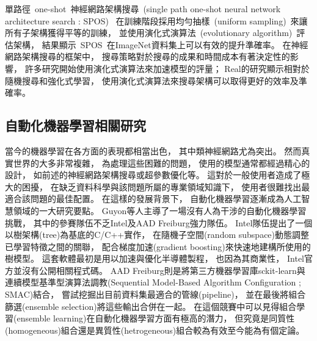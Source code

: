 \documentclass[a4paper,14pt]{extarticle}
\begin{document}
            單路徑~one-shot~神經網路架構搜尋~(single path one-shot neural network architecture search : SPOS)~\cite{guo2020single}
            在訓練階段採用均勻抽樣~(uniform sampling)~來讓所有子架構獲得平等的訓練，
            並使用演化式演算法~(evolutionary algorithm)~評估架構，
            結果顯示~SPOS~在ImageNet資料集上可以有效的提升準確率。
            在神經網路架構搜尋的框架中，
            搜尋策略對於搜尋的成果和時間成本有著決定性的影響，
            許多研究開始使用演化式演算法來加速模型的評量\cite{6791438}；
            Real\cite{real2019regularized}的研究顯示相對於隨機搜尋和強化式學習，
            使用演化式演算法來搜尋架構可以取得更好的效率及準確率。

        \subsection{自動化機器學習相關研究}
            當今的機器學習在各方面的表現都相當出色，
            其中類神經網路尤為突出。
            然而真實世界的大多非常複雜，
            為處理這些困難的問題，
            使用的模型通常都經過精心的設計，
            如前述的神經網路架構搜尋或超參數優化等。
            這對於一般使用者造成了極大的困擾，
            在缺乏資料科學與該問題所屬的專業領域知識下，
            使用者很難找出最適合該問題的最佳配置。
            在這樣的發展背景下，
            自動化機器學習逐漸成為人工智慧領域的一大研究要點。
            Guyon等人\cite{pmlr-v64-guyon_review_2016}主導了一場沒有人為干涉的自動化機器學習挑戰，
            其中的參賽隊伍不乏Intel及AAD Freiburg強力隊伍。
            Intel隊伍提出了一個以樹架構(tree)為基底的C/C++實作，
            在隨機子空間(random subspace)動態調整已學習特徵之間的關聯，
            配合梯度加速(gradient boosting)來快速地建構所使用的樹模型。
            這套軟體最初是用以加速與優化半導體製程，
            也因為其商業性，
            Intel官方並沒有公開相關程式碼。
            AAD Freiburg則是將第三方機器學習庫sckit-learn與連續模型基準型演算法調教(Sequential Model-Based Algorithm Configuration ; SMAC)結合，
            嘗試挖掘出目前資料集最適合的管線(pipeline)，
            並在最後將組合篩選(ensemble selection)將這些輸出合併在一起。
            在這個競賽中可以見得組合學習(ensemble learning)在自動化機器學習方面有極高的潛力，
            但究竟是同質性(homogeneous)組合還是異質性(hetrogeneous)組合較為有效至今能為有個定論。
\end{document}
